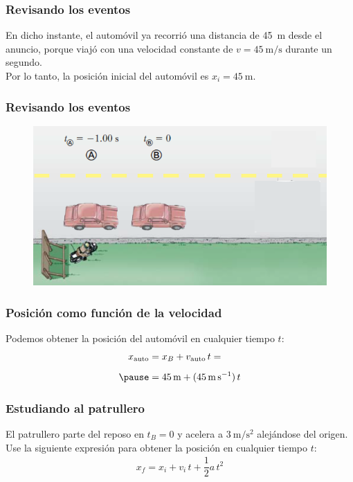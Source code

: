 \documentclass[14pt]{beamer}
\begin{document}
\begin{frame}
\frametitle{Revisando los eventos}
En dicho instante, el automóvil ya recorrió una distancia de \SI{45}{\meter} desde el anuncio, \pause porque viajó con una velocidad constante de
$v = \SI{45}{\meter\per\second}$ durante un segundo.
\\
\bigskip
\pause
Por lo tanto, la posición inicial del automóvil es $x_{i} = \SI{45}{\meter}$.
\end{frame}
\begin{frame}
\frametitle{Revisando los eventos}
\begin{figure}
    \centering
    \includegraphics[scale=0.8]{Imagenes/Ejercicio_MUA_02_02.png}
\end{figure}
\end{frame}
\begin{frame}
\frametitle{Posición como función de la velocidad}
Podemos obtener la posición del automóvil en cualquier tiempo $t$:
\pause
\begin{eqnarray*}
\begin{aligned}
x_{\text{auto}} &= x_{B} + v_{\text{auto}} \, t = \\[0.5em] \pause
&= \SI{45}{\meter} + (\SI{45}{\meter\per\second}) \, t
\end{aligned}
\end{eqnarray*}
\end{frame}
\begin{frame}
\frametitle{Estudiando al patrullero}
El patrullero parte del reposo en $t_{B} = 0$ \pause y acelera a $\SI{3}{\meter\per\square\second}$ alejándose del origen.
\\
\bigskip
\pause
Use la siguiente expresión para obtener la posición en cualquier tiempo $t$:
\pause
\begin{align*}
x_{f} = x_{i} + v_{i} \, t + \dfrac{1}{2} a \, t^{2}
\end{align*}
\end{frame}
\end{document}
